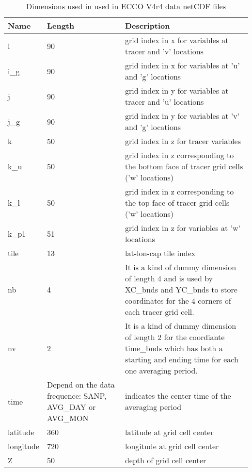 \begin{longtable}{|p{}|p{}|m{}|}
\caption{Dimensions used in used in ECCO V4r4 data netCDF files}
\label{tab:variable-attributes} \\ 
\hline \endhead
\hline \endfoot
\rowcolor{blue!25} \textbf{Name} & \textbf{Length} & \textbf{Description} \\ \hline
\rowcolor{magenta!25}
i & 90 & grid index in x for variables at tracer and 'v' locations \\ \hline
\rowcolor{magenta!25}
i\_g & 90 & grid index in x for variables at 'u' and 'g' locations \\ \hline
\rowcolor{magenta!25}
j & 90 & grid index in y for variables at tracer and 'u' locations \\ \hline
\rowcolor{magenta!25}
j\_g & 90 & grid index in y for variables at 'v' and 'g' locations \\ \hline
\rowcolor{magenta!25}
k & 50 & grid index in z for tracer variables \\ \hline
\rowcolor{magenta!25}
k\_u & 50 & grid index in z corresponding to the bottom face of tracer grid cells ('w' locations) \\ \hline
\rowcolor{magenta!25}
k\_l & 50 & grid index in z corresponding to the top face of tracer grid cells ('w' locations) \\ \hline
\rowcolor{magenta!25}
k\_p1 & 51 & grid index in z for variables at 'w' locations \\ \hline
\rowcolor{magenta!25}
tile & 13 & lat-lon-cap tile index \\ \hline
\rowcolor{magenta!25}
nb & 4 & It is a kind of dummy dimension of length 4 and is used by XC\_bnds and YC\_bnds to store coordinates for the 4 corners of each tracer grid cell. \\ \hline
\rowcolor{magenta!25}
nv & 2 & It is a kind of dummy dimension of length 2 for the coordiante time\_bnds which has both a starting and ending time for each one averaging period. \\ \hline
\rowcolor{magenta!25}
time & Depend on the data frequence: SANP, AVG\_DAY or AVG\_MON & indicates the center time of the averaging period \\ \hline
\rowcolor{magenta!25}
latitude & 360 & latitude at grid cell center \\ \hline
\rowcolor{magenta!25}
longitude & 720 & longitude at grid cell center \\ \hline
\rowcolor{magenta!25}
Z & 50 & depth of grid cell center \\ \hline
\end{longtable}
